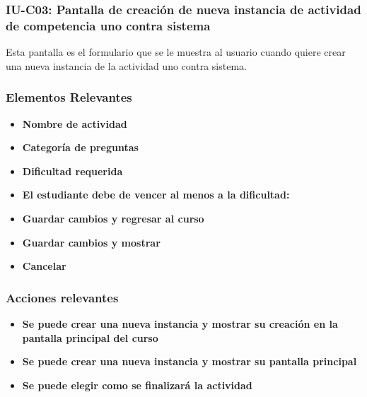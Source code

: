 
\subsubsection{IU-C03: Pantalla de creación de nueva instancia de actividad de competencia uno contra sistema}

 Esta pantalla es el formulario que se le muestra al usuario cuando quiere crear una nueva instancia de la actividad uno contra sistema.


        \subsubsection{Elementos Relevantes}

            \begin{itemize}
            \item {\bf Nombre de actividad}
            \item {\bf Categoría de preguntas}
            \item {\bf Dificultad requerida}
            \item {\bf El estudiante debe de vencer al menos a la dificultad:}
            \item {\bf Guardar cambios y regresar al curso}
            \item {\bf Guardar cambios y mostrar}
            \item {\bf Cancelar}
            \end{itemize}

        \subsubsection{Acciones relevantes}

            \begin{itemize}
            \item {\bf Se puede crear una nueva instancia y mostrar su creación en la pantalla principal del curso}
            \item {\bf Se puede crear una nueva instancia y mostrar su pantalla principal}
            \item {\bf Se puede elegir como se finalizará la actividad}
            \end{itemize}

        \clearpage
